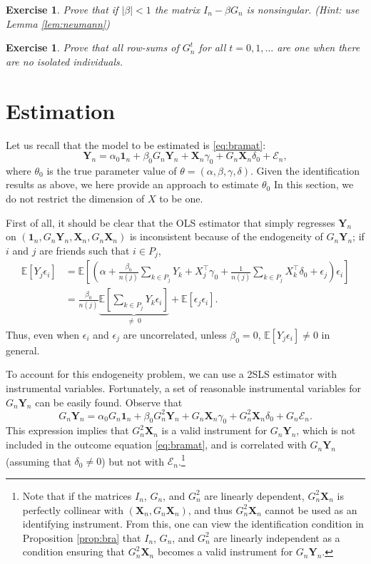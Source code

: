 \documentclass[10.5pt, A4paper, openany, uplatex]{book}
\newcommand{\mbf}{\mathbf}
\newcommand{\mcl}{\mathcal}
\newcommand{\E}{\mathbb{E}}
\newtheorem{exercise}[theorem]{Exercise}
\numberwithin{equation}{section}
\begin{document}
\hrulefill
\begin{exercise}\upshape
	Prove that if $|\beta| < 1$ the matrix $I_n - \beta G_n$ is nonsingular. (Hint: use Lemma \ref{lem:neumann})
\end{exercise}
\begin{exercise}\upshape
Prove that all row-sums of $G_n^t$ for all $t = 0, 1, \ldots$ are one when there are no isolated individuals.
\end{exercise}


\section{Estimation}\label{sec:estimation_soc}

Let us recall that the model to be estimated is \eqref{eq:bramat}:
\[
	\mbf{Y}_n = \alpha_0 \mathbf{1}_n + \beta_0 G_n \mbf{Y}_n + \mbf{X}_n \gamma_0 +  G_n \mbf{X}_n \delta_0 + \mcl{E}_n,
\]
where $\theta_0$ is the true parameter value of $\theta = (\alpha, \beta, \gamma, \delta)$.
Given the identification results as above, we here provide an approach to estimate $\theta_0$
In this section, we do not restrict the dimension of $X$ to be one.

First of all, it should be clear that the OLS estimator that simply regresses $\mbf{Y}_n$ on $(\mathbf{1}_n, G_n \mbf{Y}_n, \mbf{X}_n, G_n \mbf{X}_n)$ is inconsistent because of the endogeneity of $G_n \mbf{Y}_n$; if $i$ and $j$ are friends such that $i \in P_j$,
\begin{align*}
	\E[Y_j \epsilon_i]
	& = \E\left[\left(\alpha +\frac{\beta_0}{ n(j)} \sum_{k \in P_j} Y_k + X_j^\top \gamma_0 + \frac{1}{n(j)} \sum_{k \in P_j} X_k^\top \delta_0 + \epsilon_j\right) \epsilon_i\right] \\
	& = \frac{\beta_0}{ n(j)} \underbrace{\E\left[ \sum_{k \in P_j} Y_k \epsilon_i\right]}_{\neq \: 0} + \E[\epsilon_j \epsilon_i ].
\end{align*}
Thus, even when $\epsilon_i$ and $\epsilon_j$ are uncorrelated, unless $\beta_0 = 0$, $\E[Y_j \epsilon_i] \neq 0$ in general.

To account for this endogeneity problem, we can use a 2SLS estimator with instrumental variables.
Fortunately, a set of reasonable instrumental variables for $G_n\mbf{Y}_n$ can be easily found.
Observe that
\[
	G_n \mbf{Y}_n = \alpha_0 G_n \mathbf{1}_n + \beta_0 G^2_n \mbf{Y}_n + G_n \mbf{X}_n \gamma_0 +  G^2_n \mbf{X}_n \delta_0 + G_n \mcl{E}_n.
\]
This expression implies that $G^2_n \mbf{X}_n$ is a valid instrument for $G_n\mbf{Y}_n$, which is not included in the outcome equation \eqref{eq:bramat}, and is correlated with $G_n\mbf{Y}_n$ (assuming that $\delta_0 \neq 0$) but not with $\mcl{E}_n$.\footnote{
	Note that if the matrices $I_n$, $G_n$, and $G_n^2$ are linearly dependent, $G^2_n \mbf{X}_n$ is perfectly collinear with $(\mbf{X}_n, G_n\mbf{X}_n)$, and thus $G^2_n \mbf{X}_n$ cannot be used as an identifying instrument.
	From this, one can view the identification condition in Proposition \ref{prop:bra} that $I_n$, $G_n$, and $G_n^2$ are linearly independent as a condition ensuring that $G^2_n \mbf{X}_n$ becomes a valid instrument for $G_n\mbf{Y}_n$.
}
\end{document}
